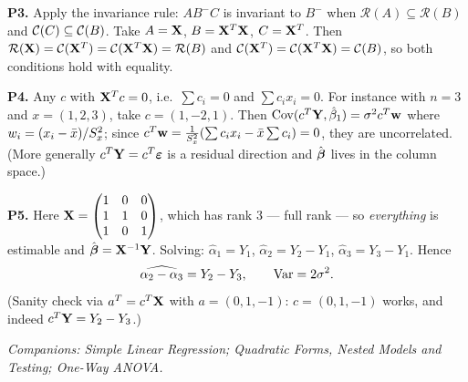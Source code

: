 \documentclass[11pt]{article}
\begin{document}
\smallskip\noindent\textbf{P3.} Apply the invariance rule: $AB^-C$ is invariant to $B^-$ when
$\mathcal{R}(A)\subseteq\mathcal{R}(B)$ and $\mathcal{C}(C)\subseteq\mathcal{C}(B)$. Take $A=\mathbf{X}$,
$B=\mathbf{X}^T\mathbf{X}$, $C=\mathbf{X}^T$. Then $\mathcal{R}(\mathbf{X})=\mathcal{C}(\mathbf{X}^T)=\mathcal{C}(\mathbf{X}^T\mathbf{X})=\mathcal{R}(B)$
and $\mathcal{C}(\mathbf{X}^T)=\mathcal{C}(\mathbf{X}^T\mathbf{X})=\mathcal{C}(B)$, so both conditions hold with equality.

\smallskip\noindent\textbf{P4.} Any $c$ with $\mathbf{X}^Tc=0$, i.e.\ $\sum c_i=0$ and
$\sum c_ix_i=0$. For instance with $n=3$ and $x=(1,2,3)$, take $c=(1,-2,1)$. Then
$\operatorname{Cov}(c^T\mathbf{Y},\hat\beta_1)=\sigma^2 c^T\mathbf{w}$ where $w_i=(x_i-\bar{x})/S_x^2$; since
$c^T\mathbf{w}=\frac{1}{S_x^2}(\sum c_ix_i-\bar{x}\sum c_i)=0$, they are uncorrelated. (More
generally $c^T\mathbf{Y}=c^T\boldsymbol{\varepsilon}$ is a residual direction and $\hat{\boldsymbol{\beta}}$ lives in the column space.)

\smallskip\noindent\textbf{P5.} Here
$\mathbf{X}=\begin{pmatrix}1&0&0\\1&1&0\\1&0&1\end{pmatrix}$, which has rank $3$ --- full rank ---
so \emph{everything} is estimable and $\hat{\boldsymbol{\beta}}=\mathbf{X}^{-1}\mathbf{Y}$. Solving:
$\hat\alpha_1=Y_1$, $\hat\alpha_2=Y_2-Y_1$, $\hat\alpha_3=Y_3-Y_1$. Hence
\[
  \widehat{\alpha_2-\alpha_3}=Y_2-Y_3,\qquad \operatorname{Var}=2\sigma^2 .
\]
(Sanity check via $a^T=c^T\mathbf{X}$ with $a=(0,1,-1)$: $c=(0,1,-1)$ works, and indeed
$c^T\mathbf{Y}=Y_2-Y_3$.)

\vfill
\begin{center}\small\itshape
Companions: Simple Linear Regression;
Quadratic Forms, Nested Models and Testing; One-Way ANOVA.
\end{center}
\end{document}
